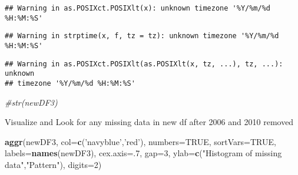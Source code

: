 \documentclass[]{article}
\newenvironment{Shaded}{\begin{snugshade}}{\end{snugshade}}
\newcommand{\CommentTok}[1]{\textcolor[rgb]{0.56,0.35,0.01}{\textit{#1}}}
\newcommand{\DataTypeTok}[1]{\textcolor[rgb]{0.13,0.29,0.53}{#1}}
\newcommand{\DecValTok}[1]{\textcolor[rgb]{0.00,0.00,0.81}{#1}}
\newcommand{\KeywordTok}[1]{\textcolor[rgb]{0.13,0.29,0.53}{\textbf{#1}}}
\newcommand{\NormalTok}[1]{#1}
\newcommand{\OperatorTok}[1]{\textcolor[rgb]{0.81,0.36,0.00}{\textbf{#1}}}
\newcommand{\OtherTok}[1]{\textcolor[rgb]{0.56,0.35,0.01}{#1}}
\newcommand{\StringTok}[1]{\textcolor[rgb]{0.31,0.60,0.02}{#1}}
\begin{document}
\begin{verbatim}
## Warning in as.POSIXct.POSIXlt(x): unknown timezone '%Y/%m/%d %H:%M:%S'
\end{verbatim}

\begin{verbatim}
## Warning in strptime(x, f, tz = tz): unknown timezone '%Y/%m/%d %H:%M:%S'
\end{verbatim}

\begin{verbatim}
## Warning in as.POSIXct.POSIXlt(as.POSIXlt(x, tz, ...), tz, ...): unknown
## timezone '%Y/%m/%d %H:%M:%S'
\end{verbatim}

\begin{Shaded}
\end{Shaded}

\begin{Shaded}
\begin{Highlighting}[]
\CommentTok{#str(newDF3)}
\end{Highlighting}
\end{Shaded}

\begin{Shaded}
\end{Shaded}

Visualize and Look for any missing data in new df after 2006 and 2010
removed

\begin{Shaded}
\begin{Highlighting}[]
\KeywordTok{aggr}\NormalTok{(newDF3, }\DataTypeTok{col=}\KeywordTok{c}\NormalTok{(}\StringTok{'navyblue'}\NormalTok{,}\StringTok{'red'}\NormalTok{),}
                  \DataTypeTok{numbers=}\OtherTok{TRUE}\NormalTok{, }
                  \DataTypeTok{sortVars=}\OtherTok{TRUE}\NormalTok{, }
                  \DataTypeTok{labels=}\KeywordTok{names}\NormalTok{(newDF3),}
                  \DataTypeTok{cex.axis=}\NormalTok{.}\DecValTok{7}\NormalTok{, }
                  \DataTypeTok{gap=}\DecValTok{3}\NormalTok{, }
                  \DataTypeTok{ylab=}\KeywordTok{c}\NormalTok{(}\StringTok{"Histogram of missing data"}\NormalTok{,}\StringTok{"Pattern"}\NormalTok{), }
                  \DataTypeTok{digits=}\DecValTok{2}\NormalTok{)}
\end{Highlighting}
\end{Shaded}
\end{document}
